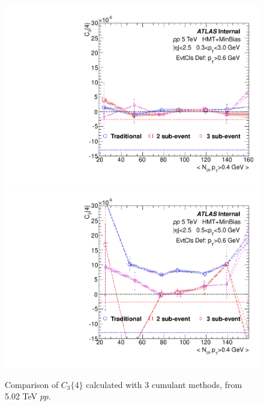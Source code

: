 \begin{figure}[p]
\includegraphics[width=0.4\linewidth]{figs/sec_result/pp5/phy_4PC_Har1_Pt0_Cls3.pdf}
\includegraphics[width=0.4\linewidth]{figs/sec_result/pp5/phy_4PC_Har1_Pt1_Cls3.pdf}
\caption{Comparison of $C_{3}\{4\}$ calculated with 3 cumulant methods, from 5.02 TeV $pp$.}
\label{fig:result_pp5_C34}
\end{figure}
\clearpage






